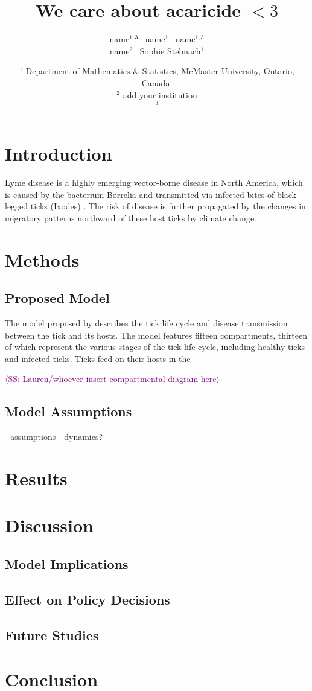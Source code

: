 \documentclass[12pt, centerh1]{article}
\title{We care about acaricide $<3$}
\author{\qquad name$^{1,3}$ \qquad\  name$^{1}$ \qquad\  name$^{1,3}$ \\  name$^{2}$ \quad\ Sophie Stelmach$^{1}$}
\date{{\small $^1$ Department of Mathematics \& Statistics, McMaster University, Ontario, Canada.\\[-6pt]
$^2$ add your institution\\[-6pt]
$^3$ \\[-6pt]
}
}
\newcommand{\sophie}[1]{{\textcolor{purple}{$\langle$SS: #1$\rangle$}}}
\begin{document}
\maketitle



\section{Introduction}
Lyme disease is a highly emerging vector-borne disease in North America, which is caused by the bacterium Borrelia and transmitted via infected bites of black-legged ticks (Ixodes) \citep{govcan}. The risk of disease is further propagated by the changes in migratory patterns northward of these host ticks by climate change. 


\section{Methods}

\subsection{Proposed Model}
The model proposed by \citep{lou2014impact} describes the tick life cycle and disease transmission between the tick and its hosts. The model features fifteen compartments, thirteen of which represent the various stages of the tick life cycle, including healthy ticks and infected ticks. 
Ticks feed on their hosts in the

\sophie{Lauren/whoever insert compartmental diagram here}

\subsection{Model Assumptions}
- assumptions
- dynamics?

\subsection{}


\section{Results}



\section{Discussion}

\subsection{Model Implications}

\subsection{Effect on Policy Decisions}

\subsection{Future Studies}


\section{Conclusion}

\newpage

\end{document}
